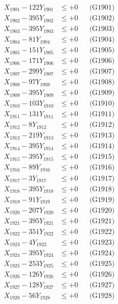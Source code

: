 \documentclass[a4paper,10pt]{article}
\begin{document}
{\begin{align}
\allowbreak
X_{1901} - 122Y_{1901} &\leq +0 && \text{(G1901)} \\
X_{1902} - 395Y_{1902} &\leq +0 && \text{(G1902)} \\
X_{1903} - 395Y_{1903} &\leq +0 && \text{(G1903)} \\
X_{1904} - 81Y_{1904} &\leq +0 && \text{(G1904)} \\
X_{1905} - 151Y_{1905} &\leq +0 && \text{(G1905)} \\
X_{1906} - 171Y_{1906} &\leq +0 && \text{(G1906)} \\
X_{1907} - 299Y_{1907} &\leq +0 && \text{(G1907)} \\
X_{1908} - 97Y_{1908} &\leq +0 && \text{(G1908)} \\
X_{1909} - 395Y_{1909} &\leq +0 && \text{(G1909)} \\
X_{1910} - 103Y_{1910} &\leq +0 && \text{(G1910)} \\
\allowbreak
X_{1911} - 131Y_{1911} &\leq +0 && \text{(G1911)} \\
X_{1912} - 8Y_{1912} &\leq +0 && \text{(G1912)} \\
X_{1913} - 219Y_{1913} &\leq +0 && \text{(G1913)} \\
X_{1914} - 395Y_{1914} &\leq +0 && \text{(G1914)} \\
X_{1915} - 395Y_{1915} &\leq +0 && \text{(G1915)} \\
X_{1916} - 89Y_{1916} &\leq +0 && \text{(G1916)} \\
X_{1917} - 3Y_{1917} &\leq +0 && \text{(G1917)} \\
X_{1918} - 395Y_{1918} &\leq +0 && \text{(G1918)} \\
X_{1919} - 91Y_{1919} &\leq +0 && \text{(G1919)} \\
X_{1920} - 207Y_{1920} &\leq +0 && \text{(G1920)} \\
\allowbreak
X_{1921} - 395Y_{1921} &\leq +0 && \text{(G1921)} \\
X_{1922} - 351Y_{1922} &\leq +0 && \text{(G1922)} \\
X_{1923} - 4Y_{1923} &\leq +0 && \text{(G1923)} \\
X_{1924} - 395Y_{1924} &\leq +0 && \text{(G1924)} \\
X_{1925} - 253Y_{1925} &\leq +0 && \text{(G1925)} \\
X_{1926} - 126Y_{1926} &\leq +0 && \text{(G1926)} \\
X_{1927} - 128Y_{1927} &\leq +0 && \text{(G1927)} \\
X_{1928} - 56Y_{1928} &\leq +0 && \text{(G1928)} \\

\end{align}}
\end{document}
